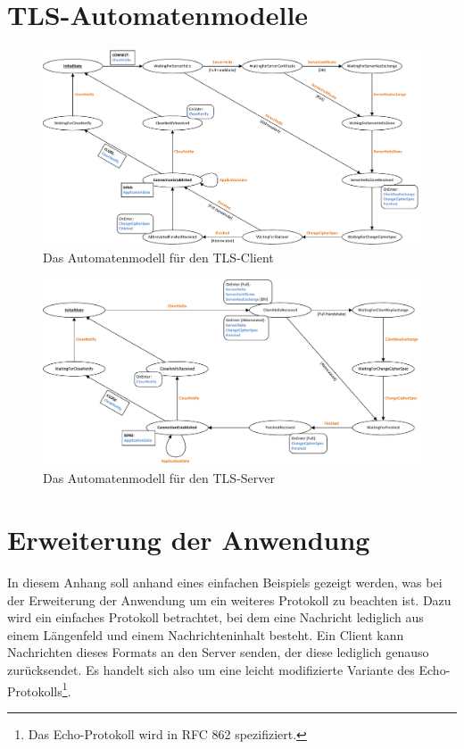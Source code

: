 \appendix

\chapter{TLS-Automatenmodelle}
\label{cha_tls_state_machines}

\begin{figure}[H]
	\centering
	\includegraphics[scale=0.75, angle = 90]{Diagrams/statemachines/client_state_machine.pdf} %
	\caption{Das Automatenmodell für den TLS-Client}
	\label{fig_tls_client_state_machine}
\end{figure}

\begin{figure}[H]
	\centering
	\includegraphics[scale=0.75, angle = 90]{Diagrams/statemachines/server_state_machine.pdf} %
	\caption{Das Automatenmodell für den TLS-Server}
	\label{fig_tls_server_state_machine}
\end{figure}


\chapter{Erweiterung der Anwendung}
\label{cha_tutorial_plugin}

In diesem Anhang soll anhand eines einfachen Beispiels gezeigt werden, was bei der Erweiterung der Anwendung um ein weiteres Protokoll zu beachten ist. Dazu wird ein einfaches Protokoll betrachtet, bei dem eine Nachricht lediglich aus einem Längenfeld und einem Nachrichteninhalt besteht. Ein Client kann Nachrichten dieses Formats an den Server senden, der diese lediglich genauso zurücksendet. Es handelt sich also um eine leicht modifizierte Variante des Echo-Protokolls\footnote{Das Echo-Protokoll wird in RFC 862 spezifiziert.}.

